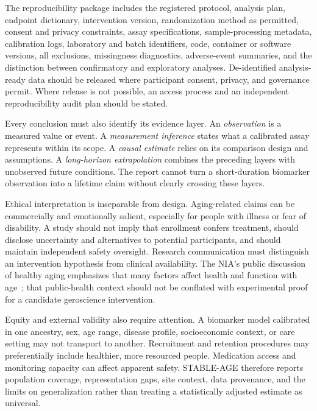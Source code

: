 \documentclass[10pt,conference]{IEEEtran}
\begin{document}
The reproducibility package includes the registered protocol, analysis plan, endpoint dictionary, intervention version, randomization method as permitted, consent and privacy constraints, assay specifications, sample-processing metadata, calibration logs, laboratory and batch identifiers, code, container or software versions, all exclusions, missingness diagnostics, adverse-event summaries, and the distinction between confirmatory and exploratory analyses. De-identified analysis-ready data should be released where participant consent, privacy, and governance permit. Where release is not possible, an access process and an independent reproducibility audit plan should be stated.

Every conclusion must also identify its evidence layer. An \emph{observation} is a measured value or event. A \emph{measurement inference} states what a calibrated assay represents within its scope. A \emph{causal estimate} relies on its comparison design and assumptions. A \emph{long-horizon extrapolation} combines the preceding layers with unobserved future conditions. The report cannot turn a short-duration biomarker observation into a lifetime claim without clearly crossing these layers.

Ethical interpretation is inseparable from design. Aging-related claims can be commercially and emotionally salient, especially for people with illness or fear of disability. A study should not imply that enrollment confers treatment, should disclose uncertainty and alternatives to potential participants, and should maintain independent safety oversight. Research communication must distinguish an intervention hypothesis from clinical availability. The NIA's public discussion of healthy aging emphasizes that many factors affect health and function with age~\cite{nia2026}; that public-health context should not be conflated with experimental proof for a candidate geroscience intervention.

Equity and external validity also require attention. A biomarker model calibrated in one ancestry, sex, age range, disease profile, socioeconomic context, or care setting may not transport to another. Recruitment and retention procedures may preferentially include healthier, more resourced people. Medication access and monitoring capacity can affect apparent safety. STABLE-AGE therefore reports population coverage, representation gaps, site context, data provenance, and the limits on generalization rather than treating a statistically adjusted estimate as universal.
\end{document}
